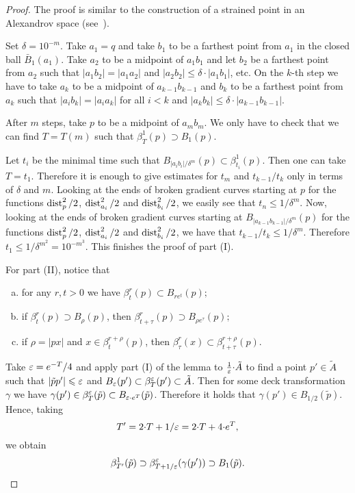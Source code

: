 \documentclass{amsart}
\begin{document}
\begin{proof}
The proof is similar to the construction of a strained point in an  Alexandrov space (see~\cite{BGP}).

Set $\delta=10^{-m}$.
Take $a_1=q$ and take $b_1$ to be a farthest point from $a_1$ in the closed ball $\bar B_1(a_1)$.
Take $a_2$ to be a midpoint of $a_1b_1$ and let  $b_2$ be
a farthest point from $a_2$
such that $|a_1b_2|=|a_1a_2|$ and $|a_2b_2|\le\delta{\cdot} |a_1b_1|$, etc.
On the $k$-th step we have to take $a_{k}$ to be a midpoint of
$a_{k-1}b_{k-1}$
and $b_{k}$
to be a farthest point from $a_{k}$
such that $|a_ib_{k}|=|a_ia_{k}|$ for all $i< k$  and
$|a_{k}b_{k}|\le\delta{\cdot}  |a_{k-1}b_{k-1}|$.

After $m$ steps, take $p$ to be a midpoint of $a_mb_m$.
We only have to check that we can find $T=T(m)$
such that $\beta^{1}_T(p)\supset B_1(p)$.

Let $t_i$ be the minimal time such that $B_{|a_ib_i|/\delta^m}(p)\subset \beta^{1}_{t_i}(p)$.
Then one can take $T=t_1$.
Therefore it is enough to give estimates for $t_m$ and $t_{k-1}/t_k$ only in terms of $\delta$ and $m$.
Looking at the ends of broken gradient curves
starting at $p$
for the functions $\operatorname{\rm dist}^2_{p}/2$, $\operatorname{\rm dist}^2_{a_i}/2$
and $ \operatorname{\rm dist}^2_{b_i}/2$, we easily see that $t_n\le 1/\delta^m$.
Now, looking
at the ends of broken gradient curves
starting at $ B_{|a_{k-1}b_{k-1}|/\delta^m}(p)$ for
the functions $\operatorname{\rm dist}^2_{p}/2$, $\operatorname{\rm dist}^2_{a_i}/2$
and $ \operatorname{\rm dist}^2_{b_i}/2$,
we have that $t_{k-1}/t_{k}\le 1/\delta^m$.
Therefore $t_1\le 1/\delta^{m^2}=10^{-m^3}$.
This finishes the proof of part (I).

For part (II),
notice that
\begin{enumerate}[a)]
\item for any $r,t>0$ we have
$\beta^r_t(p)\subset B_{re^t}(p);$
\item if $\beta^r_t(p)\supset B_{\rho}(p)$, then
$\beta^r_{t+\tau}(p)\supset B_{\rho e^\tau}(p);$
\item if $\rho=|px|$ and $x\in \beta^{r+\rho}_t(p)$,
then $\beta^{r}_\tau(x)\subset \beta^{r+\rho}_{t+\tau}(p)$.
\end{enumerate}
Take $\varepsilon=e^{-T}/4$ and apply part (I) of the lemma to $\frac1{\varepsilon}{\cdot} \tilde A$
to find a point $p'\in \tilde A$ such that $|\tilde pp'|\leqslant \varepsilon$
and $B_{\varepsilon}(p')\subset \beta^{\varepsilon}_{T}(p')\subset \tilde A$.
Then for some deck transformation $\gamma$
we have $\gamma(p')\in \beta^\varepsilon_T(\tilde p)\subset B_{\varepsilon{\cdot}  e^T}(\tilde p)$.
Therefore it holds that $\gamma(p')\in B_{1/2}(\tilde p)$.
Hence, taking
$$T'=2{\cdot} T+1/\varepsilon=2{\cdot} T+4{\cdot} e^{T},$$
we obtain
$$\beta^{1}_{T'}(\tilde p)\supset \beta^\varepsilon_{T+1/\varepsilon}(\gamma(p'))
\supset B_1(\tilde p).$$
\end{proof}
\end{document}
